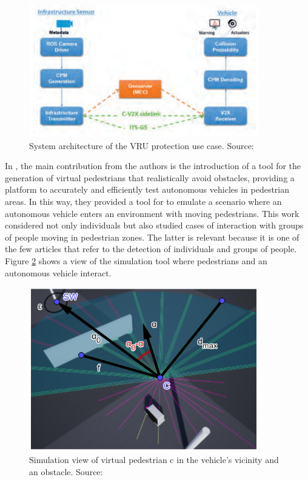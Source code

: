 \begin{figure}[ht!]
    \centering
    \includegraphics[width=10cm]{FIGURES/Fig9.png}
    \caption{System architecture of the VRU protection use case. Source: \cite{Schiegg2021}}
    \label{fig:Sch}
\end{figure}

In \cite{Jan2021}, the main contribution from the authors is the introduction of a tool for the generation of virtual pedestrians that realistically avoid obstacles, providing a platform to accurately and efficiently test autonomous vehicles in pedestrian areas. In this way, they provided a tool for to emulate a scenario where an autonomous vehicle enters an environment with moving pedestrians. This work considered not only individuals but also studied cases of interaction with groups of people moving in pedestrian zones. The latter is relevant because it is one of the few articles that refer to the detection of individuals and groups of people. Figure \ref{fig:Jan} shows a view of the simulation tool where pedestrians and an autonomous vehicle interact. 

\begin{figure}[ht!]
    \centering
    \includegraphics[width=10cm]{FIGURES/Fig11.png}
    \caption{Simulation view of virtual pedestrian c in the vehicle's vicinity and an obstacle. Source: \cite{Jan2021}}
    \label{fig:Jan}
\end{figure}


